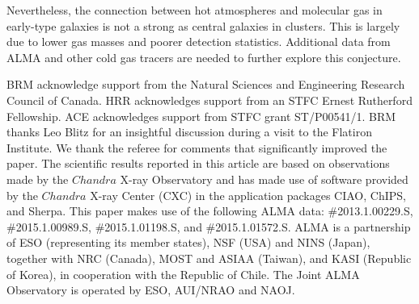 \documentclass[iop]{emulateapj}
\begin{document}
Nevertheless, the connection between hot atmospheres and molecular gas in early-type galaxies is not a strong as central galaxies in clusters.  This is largely due to lower gas masses and poorer detection statistics. Additional data from ALMA and other cold gas tracers are needed to further explore this conjecture.  



\acknowledgements
 
BRM  acknowledge support from the Natural Sciences and Engineering Research Council of Canada. HRR acknowledges support from an STFC Ernest Rutherford Fellowship. ACE acknowledges support from STFC grant ST/P00541/1. BRM thanks Leo Blitz for an insightful discussion during a visit to the Flatiron Institute.  We thank the referee for comments that significantly improved the paper. The scientific results reported in this article are based on observations made by the $Chandra$ X-ray Observatory and has made use of software provided by the $Chandra$ X-ray Center (CXC) in the application packages CIAO, ChIPS, and Sherpa. This paper makes use of the following ALMA data: \#2013.1.00229.S, \#2015.1.00989.S, \#2015.1.01198.S, and \#2015.1.01572.S. ALMA is a partnership of ESO (representing its member states), NSF (USA) and NINS (Japan), together with NRC (Canada), MOST and ASIAA (Taiwan), and KASI (Republic of Korea), in cooperation with the Republic of Chile. The Joint ALMA Observatory is operated by ESO, AUI/NRAO and NAOJ.



\end{document}
